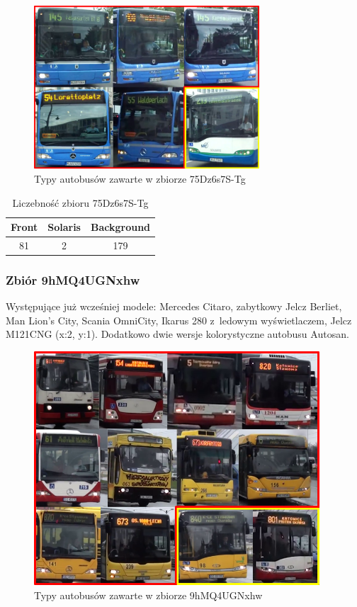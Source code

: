 \begin{figure}[!h]
    \centering
    \includegraphics[width=0.75\textwidth]{img/exp_trainig_data_75D}
    \caption{Typy autobusów zawarte w zbiorze 75Dz6s7S-Tg}
    \label{fig:75Dz6s7S-Tg_types}
\end{figure}

\begin{table}[!h]
    \centering
    \begin{tabular}{c|c|c}
        Front   & Solaris   & Background \\ \hline
        81      & 2         & 179 
    \end{tabular}
    \caption{Liczebność zbioru 75Dz6s7S-Tg}
    \label{tab:75Dz6s7S-Tg_count}
\end{table}

\subsubsection{Zbiór 9hMQ4UGNxhw}

Występujące już wcześniej modele: Mercedes Citaro, zabytkowy Jelcz Berliet,
Man Lion's City, Scania OmniCity, Ikarus 280 z~ledowym wyświetlaczem,
Jelcz M121CNG (x:2, y:1). Dodatkowo dwie wersje kolorystyczne autobusu
Autosan.

\begin{figure}[!h]
    \centering
    \includegraphics[width=0.95\textwidth]{img/exp_trainig_data_9hM}
    \caption{Typy autobusów zawarte w zbiorze 9hMQ4UGNxhw}
    \label{fig:9hMQ4UGNxhw_types}
\end{figure}

